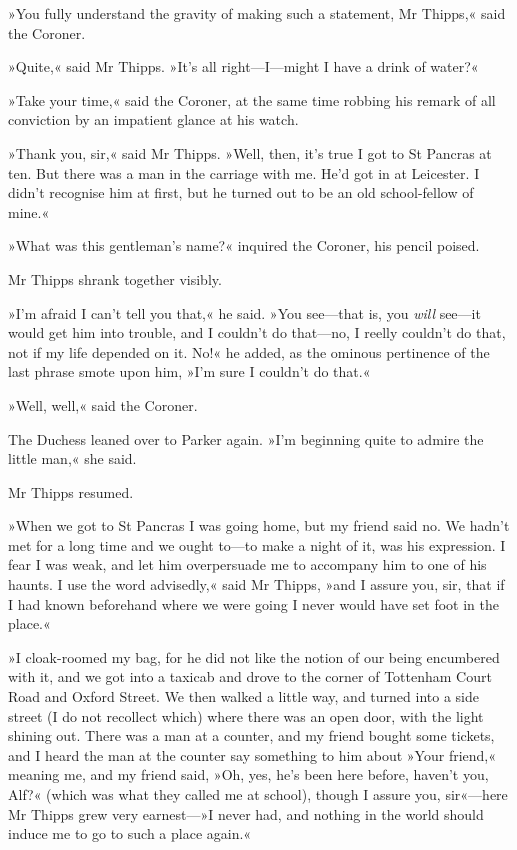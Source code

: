 »You fully understand the gravity of making such a statement, Mr Thipps,« said the Coroner.

»Quite,« said Mr Thipps. »It's all right\allowbreak---\allowbreak I---might I have a drink of water?«

»Take your time,« said the Coroner, at the same time robbing his remark of all conviction by an impatient glance at his watch.

»Thank you, sir,« said Mr Thipps. »Well, then, it's true I got to St Pancras at ten. But there was a man in the carriage with me. He'd got in at Leicester. I didn't recognise him at first, but he turned out to be an old school-fellow of mine.«

»What was this gentleman's name?« inquired the Coroner, his pencil poised.

Mr Thipps shrank together visibly.

»I'm afraid I can't tell you that,« he said. »You see\allowbreak---\allowbreak that is, you \textit{will} see\allowbreak---\allowbreak it would get him into trouble, and I couldn't do that\allowbreak---\allowbreak no, I reelly couldn't do that, not if my life depended on it. No!« he added, as the ominous pertinence of the last phrase smote upon him, »I'm sure I couldn't do that.«

»Well, well,« said the Coroner.

The Duchess leaned over to Parker again. »I'm beginning quite to admire the little man,« she said.

Mr Thipps resumed.

»When we got to St Pancras I was going home, but my friend said no. We hadn't met for a long time and we ought to\allowbreak---\allowbreak to make a night of it, was his expression. I fear I was weak, and let him overpersuade me to accompany him to one of his haunts. I use the word advisedly,« said Mr Thipps, »and I assure you, sir, that if I had known beforehand where we were going I never would have set foot in the place.«

»I cloak-roomed my bag, for he did not like the notion of our being encumbered with it, and we got into a taxicab and drove to the corner of Tottenham Court Road and Oxford Street. We then walked a little way, and turned into a side street (I do not recollect which) where there was an open door, with the light shining out. There was a man at a counter, and my friend bought some tickets, and I heard the man at the counter say something to him about »Your friend,« meaning me, and my friend said, »Oh, yes, he's been here before, haven't you, Alf?« (which was what they called me at school), though I assure you, sir«---here Mr Thipps grew very earnest---»I never had, and nothing in the world should induce me to go to such a place again.«

